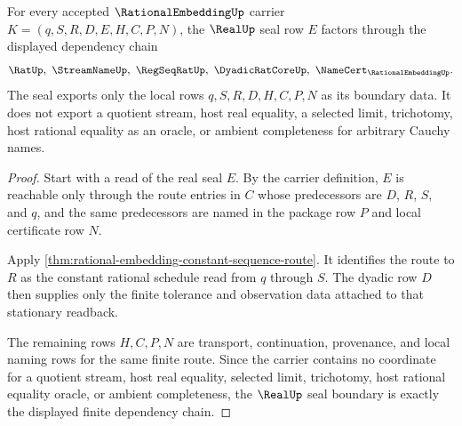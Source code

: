 \begin{theorem}
\label{thm:rational-embedding-real-seal-boundary}
For every accepted $\RationalEmbeddingUp$ carrier $K=(q,S,R,D,E,H,C,P,N)$, the $\RealUp$ seal row $E$ factors through the displayed dependency chain
$$
\RatUp,\ \StreamNameUp,\ \RegSeqRatUp,\ \DyadicRatCoreUp,\ \NameCert_{\RationalEmbeddingUp}.
$$
The seal exports only the local rows $q,S,R,D,H,C,P,N$ as its boundary data. It does not export a quotient stream, host real equality, a selected limit, trichotomy, host rational equality as an oracle, or ambient completeness for arbitrary Cauchy names.
\end{theorem}
\begin{proof}
Start with a read of the real seal $E$. By the carrier definition, $E$ is reachable only through the route entries in $C$ whose predecessors are $D$, $R$, $S$, and $q$, and the same predecessors are named in the package row $P$ and local certificate row $N$.

Apply \autoref{thm:rational-embedding-constant-sequence-route}. It identifies the route to $R$ as the constant rational schedule read from $q$ through $S$. The dyadic row $D$ then supplies only the finite tolerance and observation data attached to that stationary readback.

The remaining rows $H,C,P,N$ are transport, continuation, provenance, and local naming rows for the same finite route. Since the carrier contains no coordinate for a quotient stream, host real equality, selected limit, trichotomy, host rational equality oracle, or ambient completeness, the $\RealUp$ seal boundary is exactly the displayed finite dependency chain.
\end{proof}

